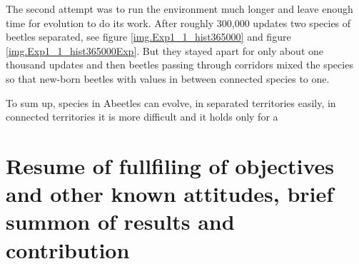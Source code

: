 \documentclass[a4paper,12pt]{report}
\begin{document}
The second attempt was to run the environment much longer and leave enough time for evolution to do its work. After roughly 300,000 updates two species of beetles separated, see figure \ref{img.Exp1_1_hist365000} and figure \ref{img.Exp1_1_hist365000Exp}. But they stayed apart for only about one thousand updates and then beetles passing through corridors mixed the species so that new-born beetles with values in between connected species to one.

To sum up, species in Abeetles can evolve, in separated territories easily, in connected territories it is more difficult and it holds only for a 



\chapter{Resume of fullfiling of objectives and other known attitudes, brief summon of results and contribution }


\end{document}
